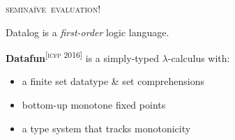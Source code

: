 \documentclass[fleqn,aspectratio=169,dvipsnames]{beamer}
\newcommand\strong\textbf
\newcommand\fn{\ensuremath{\lambda}}
\newcommand\naive{na\"ive}
\begin{document}
  \begin{frame}
    \begin{center}
      \scshape\huge semi\naive\ evaluation!
    \end{center}

    \pause
    Datalog is a \emph{first-order} logic language.
    \vspace{1em}

    \pause
    \strong{Datafun}\textsuperscript{\sffamily\scshape[icfp 2016]}
    is a simply-typed \fn-calculus with:
    \begin{itemize}
    \item a finite set datatype \& set comprehensions
    \item bottom-up monotone fixed points
    \item a type system that tracks monotonicity
    \end{itemize}
    \vspace{1em}
  \end{frame}
\end{document}
